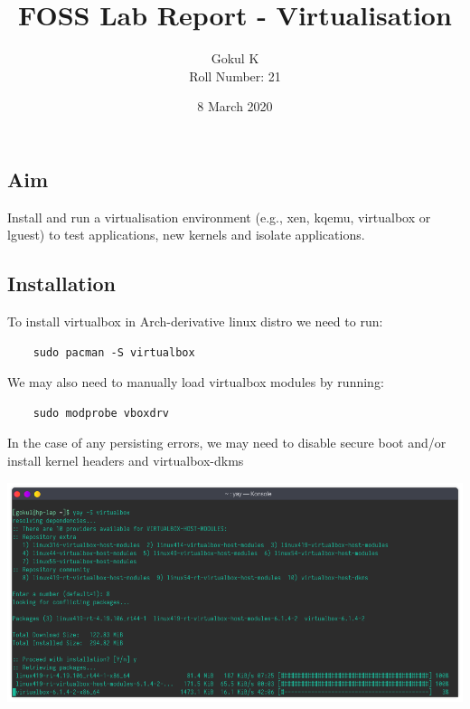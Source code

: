 \documentclass{article}
\begin{document}
\title{FOSS Lab Report - Virtualisation}
\author{Gokul K\\[2\baselineskip]
Roll Number: 21\\[2\baselineskip]}
\date{8 March 2020}

\maketitle

\newpage

\tableofcontents

\newpage

\setcounter{section}{26}
\subsection{Aim}
Install and run a virtualisation environment (e.g., xen, kqemu, virtualbox or lguest)
to test applications, new kernels and isolate applications.

\newpage

\subsection{Installation}
To install virtualbox in Arch-derivative linux distro we need to run:
\begin{verbatim}
	sudo pacman -S virtualbox
\end{verbatim}
We may also need to manually load virtualbox modules by running:
\begin{verbatim}
	sudo modprobe vboxdrv
\end{verbatim}
In the case of any persisting errors, we may need to disable secure boot
and/or install kernel headers and virtualbox-dkms
\newline\newline\newline

\includegraphics[width=1.2\textwidth]{img/p26/ss3.png}
\end{document}
